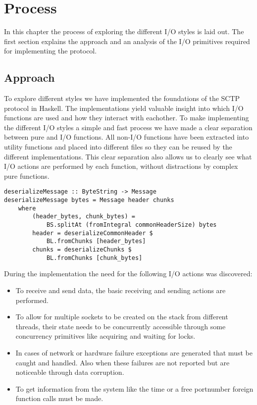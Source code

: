 \chapter{Process}
In this chapter the process of exploring the different I/O styles is laid out. The first section explains the approach and an analysis of the I/O primitives required for implementing the protocol.

\section{Approach}
To explore different styles we have implemented the foundations of the SCTP protocol\cite{_rfc_????} in Haskell. The implementations yield valuable insight into which I/O functions are used and how they interact with eachother.
To make implementing the different I/O styles a simple and fast process we have made a clear separation between pure and I/O functions. All non-I/O functions have been extracted into utility functions and placed into different files so they can be reused by the different implementations. This clear separation also allows us to clearly see what I/O actions are performed by each function, without distractions by complex pure functions.

\begin{lstlisting}[caption={An example of a shared pure function}]
deserializeMessage :: ByteString -> Message
deserializeMessage bytes = Message header chunks
    where
        (header_bytes, chunk_bytes) =
            BS.splitAt (fromIntegral commonHeaderSize) bytes
        header = deserializeCommonHeader $
            BL.fromChunks [header_bytes]
        chunks = deserializeChunks $
            BL.fromChunks [chunk_bytes]
\end{lstlisting}

During the implementation the need for the following I/O actions was discovered:

\begin{itemize}

\item To receive and send data, the basic receiving and sending actions are performed.

\item To allow for multiple sockets to be created on the stack from different threads, their state needs to be concurrently accessible through some concurrency primitives like acquiring and waiting for locks.

\item In cases of network or hardware failure exceptions are generated that must be caught and handled. Also when these failures are not reported but are noticeable through data corruption.

\item To get information from the system like the time or a free portnumber foreign function calls must be made.
\end{itemize}


